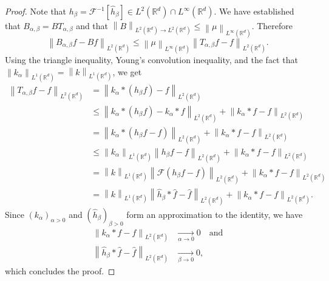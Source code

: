 \documentclass{article}
\theoremstyle{definition}
\newcommand{\R}{\mathbb{R}}
\newcommand{\norm}[1]{\left\lVert#1\right\rVert}
\newcommand{\fourier}{\mathcal{F}}
\newcommand{\fhat}[1]{\widehat{#1}}
\begin{document}
\begin{proof}
    Note that \(h_\beta = \fourier^{-1}[\fhat{h}_\beta]\in L^2(\R^d)\cap L^\infty(\R^d)\).
    We have established that \(B_{\alpha,\beta} = BT_{\alpha,\beta}\)
    and that \(\norm{B}_{L^2(\R^d)\to L^2(\R^d)}\leq \norm{\mu}_{L^\infty(\R^d)}\). 
    Therefore   
    \begin{equation*}
        \norm{B_{\alpha,\beta}f - Bf}_{L^2(\R^d)}
        \leq
        \norm{\mu}_{L^\infty(\R^d)}
        \norm{T_{\alpha,\beta}f - f}_{L^2(\R^d)}.
    \end{equation*}
    Using the triangle inequality, 
    Young's convolution inequality,
    and the fact that \(\norm{k_\alpha}_{L^1(\R^d)} = \norm{k}_{L^1(\R^d)}\),
    we get
    \begin{align*}
        \norm{T_{\alpha,\beta}f - f}_{L^2(\R^d)}
        & =
        \norm{ k_\alpha * (h_\beta f) - f }_{L^2(\R^d)}
        \\
        &\leq 
        \norm{k_\alpha * (h_\beta f) - k_\alpha * f}_{L^2(\R^d)}
        +
        \norm{k_\alpha*f - f}_{L^2(\R^d)}\\
        &=
        \norm{k_\alpha * (h_\beta f- f)}_{L^2(\R^d)}
        +
        \norm{k_\alpha*f - f}_{L^2(\R^d)}
        \\
        &\leq
        \norm{k_\alpha}_{L^1(\R^d)}
        \norm{h_\beta f - f}_{L^2(\R^d)}
        +
        \norm{k_\alpha * f - f}_{L^2(\R^d)}
        \\
        &=
        \norm{k}_{L^1(\R^d)}
        \norm{\fourier(h_\beta f - f)}_{L^2(\R^d)}
        +
        \norm{k_\alpha * f - f}_{L^2(\R^d)}
        \\
        &=
        \norm{k}_{L^1(\R^d)}
        \norm{\fhat{h}_\beta * \fhat{f} - \fhat{f}}_{L^2(\R^d)}
        +
        \norm{k_\alpha * f - f}_{L^2(\R^d)}.
    \end{align*}
    Since \((k_\alpha)_{\alpha>0}\) and \((\fhat{h}_\beta)_{\beta>0}\) form an approximation to the identity,
    we have
    \begin{align*}
        \norm{k_\alpha * f - f}_{L^2(\R^d)}
        &\xrightarrow[\alpha\to 0]{}0\quad\text{and}\\
        \norm{\fhat{h}_\beta * \fhat{f} - \fhat{f}}_{L^2(\R^d)}
        &\xrightarrow[\beta\to 0]{}0,
    \end{align*}
    which concludes the proof.
\end{proof}
\end{document}
